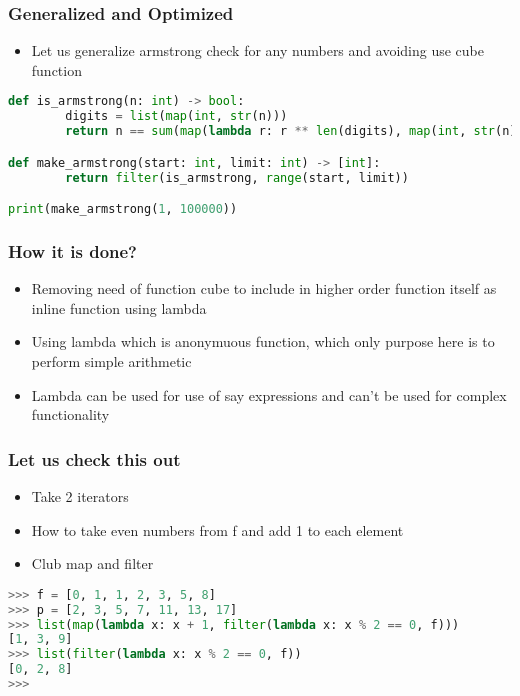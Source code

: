 \documentclass[14pt]{beamer}
\begin{document}
    \begin{frame}[containsverbatim]
        \frametitle{Generalized and Optimized}
		\begin{itemize}
		\item Let us generalize armstrong check for any numbers and avoiding use cube function
		\end{itemize}
        \begin{lstlisting}[language=Python]
def is_armstrong(n: int) -> bool:
        digits = list(map(int, str(n)))
        return n == sum(map(lambda r: r ** len(digits), map(int, str(n))))

def make_armstrong(start: int, limit: int) -> [int]:
        return filter(is_armstrong, range(start, limit))

print(make_armstrong(1, 100000))
        \end{lstlisting}
    \end{frame}

    \begin{frame}[containsverbatim]
        \frametitle{How it is done?}
		\begin{itemize}
		\item Removing need of function cube to include in higher order function itself as inline function using lambda
		\item Using lambda which is anonymuous function, which only purpose here is to perform simple arithmetic
		\item Lambda can be used for use of say expressions and can't be used for complex functionality
		\end{itemize}
    \end{frame}

    \begin{frame}[containsverbatim]
        \frametitle{Let us check this out}
		\begin{itemize}
		\item Take 2 iterators
		\item How to take even numbers from f and add 1 to each element
		\item \alert {Club map and filter}
		\end{itemize}
        \begin{lstlisting}[language=Python]
>>> f = [0, 1, 1, 2, 3, 5, 8]
>>> p = [2, 3, 5, 7, 11, 13, 17]
>>> list(map(lambda x: x + 1, filter(lambda x: x % 2 == 0, f)))
[1, 3, 9]
>>> list(filter(lambda x: x % 2 == 0, f))
[0, 2, 8]
>>> 
        \end{lstlisting}
    \end{frame}
\end{document}
